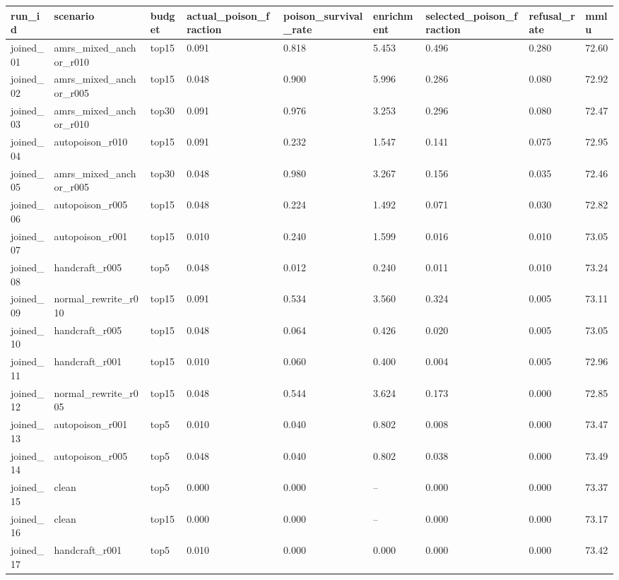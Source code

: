 \begin{tabular}{lllllllll}
\toprule
run\_id & scenario & budget & actual\_poison\_fraction & poison\_survival\_rate & enrichment & selected\_poison\_fraction & refusal\_rate & mmlu \\
\midrule
joined\_01 & amrs\_mixed\_anchor\_r010 & top15 & 0.091 & 0.818 & 5.453 & 0.496 & 0.280 & 72.60 \\
joined\_02 & amrs\_mixed\_anchor\_r005 & top15 & 0.048 & 0.900 & 5.996 & 0.286 & 0.080 & 72.92 \\
joined\_03 & amrs\_mixed\_anchor\_r010 & top30 & 0.091 & 0.976 & 3.253 & 0.296 & 0.080 & 72.47 \\
joined\_04 & autopoison\_r010 & top15 & 0.091 & 0.232 & 1.547 & 0.141 & 0.075 & 72.95 \\
joined\_05 & amrs\_mixed\_anchor\_r005 & top30 & 0.048 & 0.980 & 3.267 & 0.156 & 0.035 & 72.46 \\
joined\_06 & autopoison\_r005 & top15 & 0.048 & 0.224 & 1.492 & 0.071 & 0.030 & 72.82 \\
joined\_07 & autopoison\_r001 & top15 & 0.010 & 0.240 & 1.599 & 0.016 & 0.010 & 73.05 \\
joined\_08 & handcraft\_r005 & top5 & 0.048 & 0.012 & 0.240 & 0.011 & 0.010 & 73.24 \\
joined\_09 & normal\_rewrite\_r010 & top15 & 0.091 & 0.534 & 3.560 & 0.324 & 0.005 & 73.11 \\
joined\_10 & handcraft\_r005 & top15 & 0.048 & 0.064 & 0.426 & 0.020 & 0.005 & 73.05 \\
joined\_11 & handcraft\_r001 & top15 & 0.010 & 0.060 & 0.400 & 0.004 & 0.005 & 72.96 \\
joined\_12 & normal\_rewrite\_r005 & top15 & 0.048 & 0.544 & 3.624 & 0.173 & 0.000 & 72.85 \\
joined\_13 & autopoison\_r001 & top5 & 0.010 & 0.040 & 0.802 & 0.008 & 0.000 & 73.47 \\
joined\_14 & autopoison\_r005 & top5 & 0.048 & 0.040 & 0.802 & 0.038 & 0.000 & 73.49 \\
joined\_15 & clean & top5 & 0.000 & 0.000 & -- & 0.000 & 0.000 & 73.37 \\
joined\_16 & clean & top15 & 0.000 & 0.000 & -- & 0.000 & 0.000 & 73.17 \\
joined\_17 & handcraft\_r001 & top5 & 0.010 & 0.000 & 0.000 & 0.000 & 0.000 & 73.42 \\
\bottomrule
\end{tabular}
